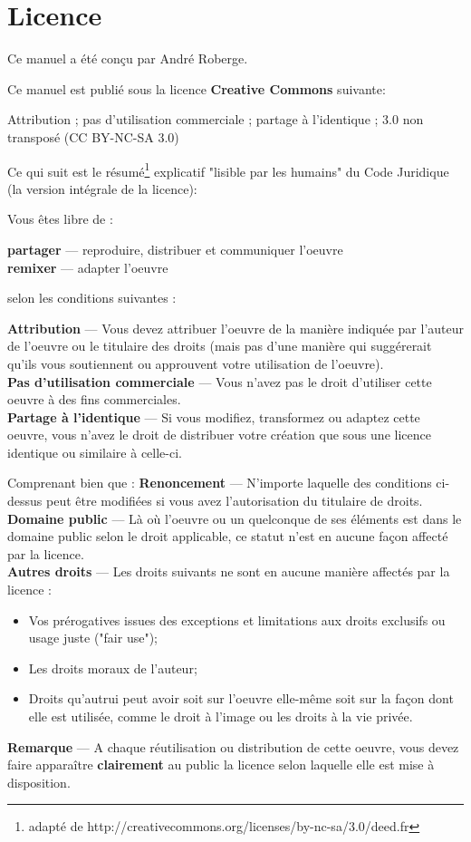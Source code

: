 
\chapter{Licence \ccLogo \ccAttribution \ccNonCommercial \ccShareAlike}

\setlength{\parindent}{0pt}
{\large
Ce manuel a été conçu par André Roberge. \bigskip

Ce  manuel est publié sous la licence {\bfseries Creative Commons \ccLogo} suivante:

Attribution \ccAttribution; pas d'utilisation commerciale \ccNonCommercial; partage à l'identique \ccShareAlike; 3.0 non transposé (CC BY-NC-SA 3.0)
}

{\small
Ce qui suit est le résumé\footnote{adapté de http://creativecommons.org/licenses/by-nc-sa/3.0/deed.fr} explicatif "lisible par les humains" du Code Juridique (la version intégrale de la licence):
\smallskip

Vous êtes libre de :\smallskip

{\bfseries partager} — reproduire, distribuer et communiquer l'oeuvre\\
{\bfseries remixer} — adapter l'oeuvre\smallskip

selon les conditions suivantes :\smallskip

{\Huge \ccAttribution} {\bfseries Attribution} — Vous devez attribuer l'oeuvre de la manière indiquée par l'auteur de l'oeuvre ou le titulaire des droits (mais pas d'une manière qui suggérerait qu'ils vous soutiennent ou approuvent votre utilisation de l'oeuvre).\\
{\Huge \ccNonCommercial} {\bfseries Pas d’utilisation commerciale} — Vous n'avez pas le droit d'utiliser cette oeuvre à des fins commerciales.\\
{\Huge \ccShareAlike} {\bfseries Partage à l'identique} — Si vous modifiez, transformez ou adaptez cette oeuvre, vous n'avez le droit de distribuer votre création que sous une licence identique ou similaire à celle-ci.\smallskip

Comprenant bien que :
{\bfseries Renoncement} — N'importe laquelle des conditions ci-dessus peut être modifiées si vous avez l'autorisation du titulaire de droits.\\
{\bfseries Domaine public} — Là où l'oeuvre ou un quelconque de ses éléments est dans le domaine public selon le droit applicable, ce statut n'est en aucune façon affecté par la licence.\\
{\bfseries Autres droits} — Les droits suivants ne sont en aucune manière affectés par la licence :
\begin{itemize}
\item Vos prérogatives issues des exceptions et limitations aux droits exclusifs ou usage juste ("fair use");
\item Les droits moraux de l'auteur;
\item Droits qu'autrui peut avoir soit sur l'oeuvre elle-même soit sur la façon dont elle est utilisée, comme le droit à l'image ou les droits à la vie privée.
\end{itemize}
{\bfseries Remarque} — A chaque réutilisation ou distribution de cette oeuvre, vous devez faire apparaître {\bfseries clairement} au public la licence selon laquelle elle est mise à disposition.
}

